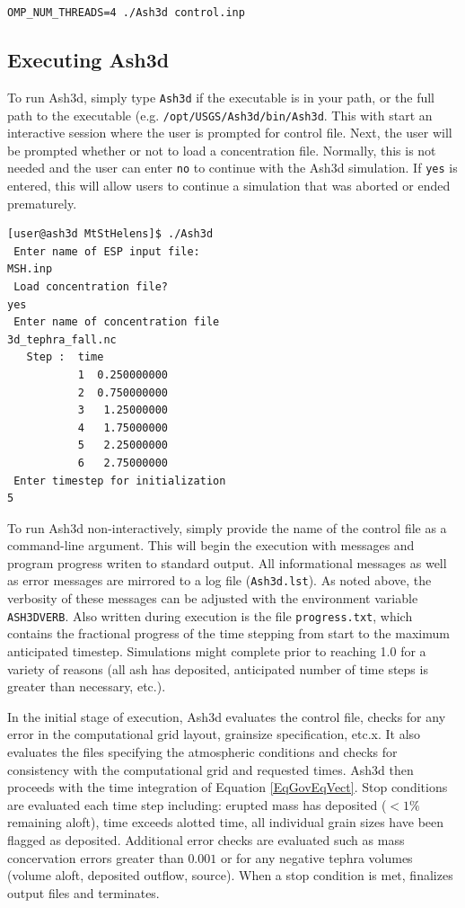 \texttt{OMP\_NUM\_THREADS=4 ./Ash3d control.inp}



\subsection{Executing Ash3d}
To run Ash3d, simply type \texttt{Ash3d} if the executable is in your path, or
the full path to the executable (e.g. \texttt{/opt/USGS/Ash3d/bin/Ash3d}. This
with start an interactive session where the user is prompted for control file.
Next, the user will be prompted whether or not to load a concentration file.
Normally, this is not needed and the user can enter \texttt{no} to continue
with the Ash3d simulation. If \texttt{yes} is entered,
this will allow users to continue a simulation that was aborted or ended prematurely.

\begin{verbatim}
[user@ash3d MtStHelens]$ ./Ash3d 
 Enter name of ESP input file:
MSH.inp
 Load concentration file?
yes
 Enter name of concentration file
3d_tephra_fall.nc
   Step :  time
           1  0.250000000    
           2  0.750000000    
           3   1.25000000    
           4   1.75000000    
           5   2.25000000    
           6   2.75000000    
 Enter timestep for initialization
5
\end{verbatim}

To run Ash3d non-interactively, simply provide the name of the control file as
a command-line argument. This will begin the execution with messages and program
progress writen to standard output. All informational messages as well as
error messages are mirrored to a log file (\texttt{Ash3d.lst}). As noted above,
the verbosity of these messages can be adjusted with the environment variable
\texttt{ASH3DVERB}. Also written during execution is the file \texttt{progress.txt},
which contains the fractional progress of the time stepping from start to the maximum
anticipated timestep. Simulations might complete prior to reaching 1.0 for a
variety of reasons (all ash has deposited, anticipated number of time steps is
greater than necessary, etc.).

In the initial stage of execution, Ash3d evaluates the control file, checks for
any error in the computational grid layout, grainsize specification, etc.x. It
also evaluates the files specifying the atmospheric conditions and checks for
consistency with the computational grid and requested times. Ash3d then
proceeds with the time integration of Equation \ref{EqGovEqVect}. Stop conditions
are evaluated each time step including: erupted mass has deposited ($<1\%$ remaining aloft),
time exceeds alotted time, all individual grain sizes have been flagged as deposited.
Additional error checks are evaluated such as mass concervation errors greater than
$0.001$ or for any negative tephra volumes (volume aloft, deposited outflow, source).
When a stop condition is met, finalizes output files and terminates.
%
